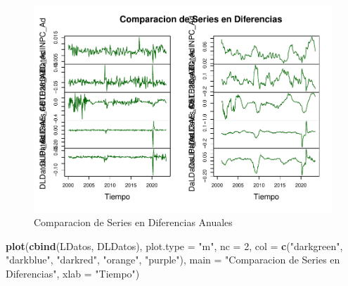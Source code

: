 \documentclass[
]{book}
\newenvironment{Shaded}{\begin{snugshade}}{\end{snugshade}}
\newcommand{\AttributeTok}[1]{\textcolor[rgb]{0.13,0.29,0.53}{#1}}
\newcommand{\DecValTok}[1]{\textcolor[rgb]{0.00,0.00,0.81}{#1}}
\newcommand{\FunctionTok}[1]{\textcolor[rgb]{0.13,0.29,0.53}{\textbf{#1}}}
\newcommand{\NormalTok}[1]{#1}
\newcommand{\StringTok}[1]{\textcolor[rgb]{0.31,0.60,0.02}{#1}}
\begin{document}
\begin{figure}

{\centering \includegraphics{Notas-Series-Tiempo_files/figure-latex/fig74-1} 

}

\caption{Comparacion de Series en Diferencias Anuales}\label{fig:fig74}
\end{figure}

\begin{Shaded}
\begin{Highlighting}[]
\FunctionTok{plot}\NormalTok{(}\FunctionTok{cbind}\NormalTok{(LDatos, DLDatos), }
     \AttributeTok{plot.type =} \StringTok{"m"}\NormalTok{, }\AttributeTok{nc =} \DecValTok{2}\NormalTok{,}
     \AttributeTok{col =} \FunctionTok{c}\NormalTok{(}\StringTok{"darkgreen"}\NormalTok{, }\StringTok{"darkblue"}\NormalTok{, }\StringTok{"darkred"}\NormalTok{, }\StringTok{"orange"}\NormalTok{, }\StringTok{"purple"}\NormalTok{), }
     \AttributeTok{main =} \StringTok{"Comparacion de Series en Diferencias"}\NormalTok{, }
     \AttributeTok{xlab =} \StringTok{"Tiempo"}\NormalTok{)}
\end{Highlighting}
\end{Shaded}
\end{document}
